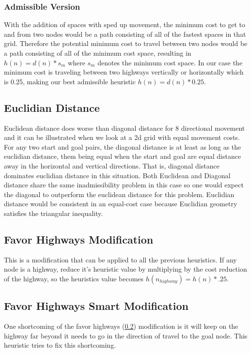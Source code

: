 \documentclass[11pt,letter]{article}
\begin{document}
\subsubsection{Admissible Version}
 With the addition of spaces with sped up movement, the minimum cost to get to and from two nodes would be a path consisting of all of the fastest spaces in that grid. Therefore the potential minimum cost to travel between two nodes would be a path consisting of all of the minimum cost space, resulting in $h(n) = d(n)*s_m$ where $s_m$ denotes the minimum cost space. In our case the minimum cost is traveling between two highways vertically or horizontally which is 0.25, making our best admissible heuristic $h(n) = d(n)*0.25$. 

\subsection{Euclidian Distance}
Euclidean distance does worse than diagonal distance for 8 directional movement and it can be illustrated when we look at a 2d grid with equal movement costs.
For any two start and goal pairs, the diagonal distance is at least as long as the euclidian distance, them being equal when the start and goal are equal distance away in the horizontal and vertical directions.
That is, diagonal distance dominates euclidian distance in this situation. Both Euclidean and Diagonal distance share the same inadmissibility problem in this case so one would expect the diagonal to outperform the euclidean distance for this problem. 
Euclidian distance would be consistent in an equal-cost case because Euclidian geometry satisfies the triangular inequality.

\subsection{Favor Highways Modification} \label{favor highways}
This is a modification that can be applied to all the previous heuristics. If any node is a highway, reduce it’s heuristic value by multiplying by the cost reduction of the highway, so the heuristics value becomes $h(n_{highway}) = h(n)*.25$.

\subsection{Favor Highways Smart Modification}
One shortcoming of the favor highways (\ref{favor highways}) modification is it will keep on the highway far beyond it needs to go in the direction of travel to the goal node. This heuristic tries to fix this shortcoming. 
\end{document}
